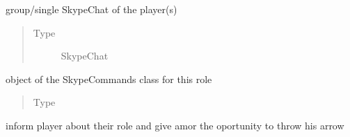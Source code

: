 \documentclass[letterpaper,10pt,english]{sphinxmanual}
\begin{document}
\begin{fulllineitems}
\begin{fulllineitems}
\begin{quote}
\begin{description}
\end{description}\end{quote}

\end{fulllineitems}



\begin{fulllineitems}
group/single SkypeChat of the player(s)
\begin{quote}\begin{description}
\item[{Type}] \leavevmode
SkypeChat

\end{description}\end{quote}

\end{fulllineitems}



\begin{fulllineitems}
object of the SkypeCommands class for this role
\begin{quote}\begin{description}
\item[{Type}] \leavevmode
{\hyperref[\detokenize{chatwolf:chatwolf.skypecommands.SkypeCommands}]{}}

\end{description}\end{quote}

\end{fulllineitems}



\begin{fulllineitems}
inform player about their role and give amor the oportunity to throw his arrow

\end{fulllineitems}



\begin{fulllineitems}
\end{fulllineitems}


\end{fulllineitems}
\end{document}
